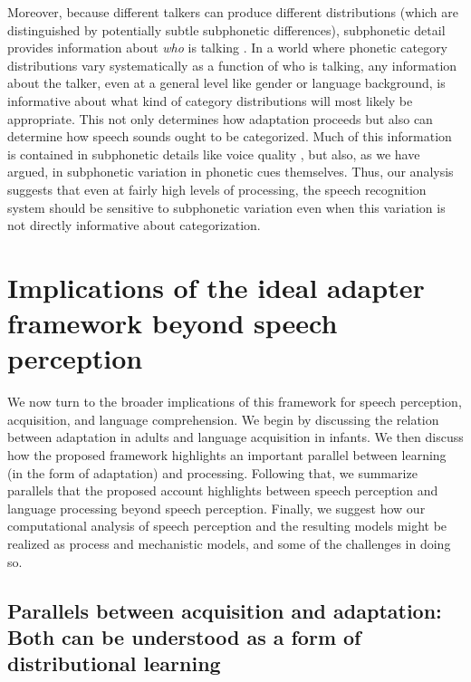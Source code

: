 Moreover, because different talkers can produce different distributions (which are distinguished by potentially subtle subphonetic differences), subphonetic detail provides information about \emph{who} is talking \autocite{Creel2011,Pardo2006}.  In a world where phonetic category distributions vary systematically as a function of who is talking, any information about the talker, even at a general level like gender or language background, is informative about what kind of category distributions will most likely be appropriate.  This not only determines how adaptation proceeds but also can determine how speech sounds ought to be categorized.  Much of this information is contained in subphonetic details like voice quality \autocite{Pardo2006}, but also, as we have argued, in subphonetic variation in phonetic cues themselves.  Thus, our analysis suggests that even at fairly high levels of processing, the speech recognition system should be sensitive to subphonetic variation even when this variation is not directly informative about categorization.

\label{r3-epi-abs-end}
\label{r1-epi-abs-end}

\section{Implications of the ideal adapter framework beyond speech perception}
\label{sec:general-discussion}

We now turn to the broader implications of this framework for speech perception, acquisition, and language comprehension. We begin by discussing the relation between adaptation in adults and language acquisition in infants. We then discuss how the proposed framework highlights an important parallel between learning (in the form of adaptation) and processing. Following that, we summarize parallels that the proposed account highlights between speech perception and language processing beyond speech perception.
Finally, we suggest how our computational analysis of speech perception and the resulting models might be realized as process and mechanistic models, and some of the challenges in doing so.

\subsection{Parallels between acquisition and adaptation: Both can be understood as a form of distributional learning}
\label{sec:parall-betw-proc}

